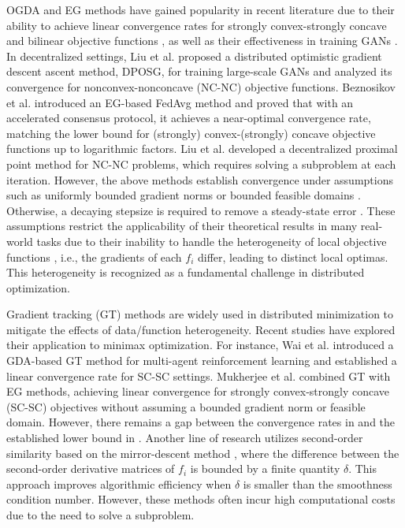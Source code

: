 \documentclass[letterpaper, 10 pt, conference]{ieeeconf}
\begin{document}
OGDA and EG methods have gained popularity in recent literature due to their ability to achieve linear convergence rates for strongly convex-strongly concave and bilinear objective functions \cite{mokhtari2020unified, azizian2020tight}, as well as their effectiveness in training GANs \cite{daskalakis2017training, liang2019interaction}.
In decentralized settings, Liu et al. \cite{liu2020decentralized} proposed a distributed optimistic gradient descent ascent method, DPOSG, for training large-scale GANs and analyzed its convergence for nonconvex-nonconcave (NC-NC) objective functions.
Beznosikov et al. \cite{beznosikov2020distributed} introduced an EG-based FedAvg method and proved that with an accelerated consensus protocol, it achieves a near-optimal convergence rate, matching the lower bound for (strongly) convex-(strongly) concave objective functions up to logarithmic factors.
Liu et al. \cite{liu2019decentralized} developed a decentralized proximal point method for NC-NC problems, which requires solving a subproblem at each iteration.
However, the above methods establish convergence under assumptions such as uniformly bounded gradient norms \cite{liu2020decentralized} or bounded feasible domains \cite{liu2019decentralized, beznosikov2020distributed}. 
Otherwise, a decaying stepsize is required to remove a steady-state error \cite{cai2024diffusion}.
These assumptions restrict the applicability of their theoretical results in many real-world tasks due to their inability to handle the heterogeneity of local objective functions \cite{lian2017can}, i.e., the gradients of each $f_i$ differ, leading to distinct local optimas. This heterogeneity is recognized as a fundamental challenge in distributed optimization.

Gradient tracking (GT) methods \cite{xu2015augmented, pu2021distributed} are widely used in distributed minimization to mitigate the effects of data/function heterogeneity. Recent studies have explored their application to minimax optimization. For instance, Wai et al. \cite{wai2018multi} introduced a GDA-based GT method for multi-agent reinforcement learning and established a linear convergence rate for SC-SC settings.
Mukherjee et al. \cite{mukherjee2020decentralized} combined GT with EG methods, achieving linear convergence for strongly convex-strongly concave (SC-SC) objectives without assuming a bounded gradient norm or feasible domain. However, there remains a gap between the convergence rates in \cite{wai2018multi, mukherjee2020decentralized} and the established lower bound in \cite{beznosikov2020distributed}.
Another line of research utilizes second-order similarity based on the mirror-descent method \cite{sonata, beznosikov2021distributed, zhou2024near}, where the difference between the second-order derivative matrices of $f_i$ is bounded by a finite quantity $\delta$. This approach improves algorithmic efficiency when $\delta$ is smaller than the smoothness condition number. However, these methods often incur high computational costs due to the need to solve a subproblem.
\end{document}
